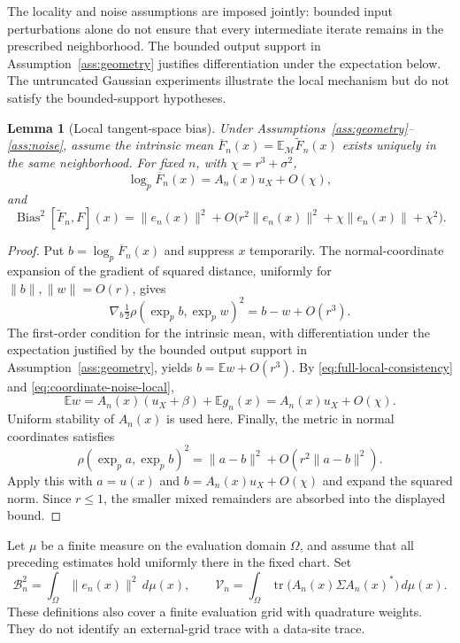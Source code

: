 \documentclass[12pt]{article}
\newtheorem{lemma}[theorem]{Lemma}
\newcommand{\M}{\mathcal{M}}
\newcommand{\bias}{\operatorname{Bias}^2}
\begin{document}
The locality and noise assumptions are imposed jointly: bounded input perturbations alone do not ensure that every intermediate iterate remains in the prescribed neighborhood. The bounded output support in Assumption~\ref{ass:geometry} justifies differentiation under the expectation below. The untruncated Gaussian experiments illustrate the local mechanism but do not satisfy the bounded-support hypotheses.

\begin{lemma}[Local tangent-space bias]\label{lem:manifold-linearization}
Under Assumptions~\ref{ass:geometry}--\ref{ass:noise}, assume the intrinsic mean $\overline F_n(x)=\mathbb E_{\M}\widetilde F_n(x)$ exists uniquely in the same neighborhood. For fixed $n$, with $\chi=r^3+\sigma^2$,
\[
 \log_p\overline F_n(x)=A_n(x)u_X+O(\chi),
\]
and
\[
 \bias[\widetilde F_n,F](x)=\|e_n(x)\|^2+
 O\bigl(r^2\|e_n(x)\|^2+\chi\|e_n(x)\|+\chi^2\bigr).
\]
\end{lemma}

\begin{proof}
Put $b=\log_p\overline F_n(x)$ and suppress $x$ temporarily. The normal-coordinate expansion of the gradient of squared distance, uniformly for $\|b\|,\|w\|=O(r)$, gives
\[
 \nabla_b\tfrac12\rho(\exp_pb,\exp_pw)^2=b-w+O(r^3).
\]
The first-order condition for the intrinsic mean, with differentiation under the expectation justified by the bounded output support in
Assumption~\ref{ass:geometry}, yields $b=\mathbb Ew+O(r^3)$. By \eqref{eq:full-local-consistency} and \eqref{eq:coordinate-noise-local},
\[
 \mathbb Ew=A_n(x)(u_X+\beta)+\mathbb Eg_n(x)
           =A_n(x)u_X+O(\chi).
\]
Uniform stability of $A_n(x)$ is used here. Finally, the metric in normal coordinates satisfies
\[
 \rho(\exp_pa,\exp_pb)^2
 =\|a-b\|^2+O(r^2\|a-b\|^2).
\]
Apply this with $a=u(x)$ and $b=A_n(x)u_X+O(\chi)$ and expand the squared norm. Since $r\leq1$, the smaller mixed remainders are absorbed into the displayed bound.
\end{proof}

Let $\mu$ be a finite measure on the evaluation domain $\Omega$, and assume that all preceding estimates hold uniformly there in the fixed chart. Set
\[
 \mathcal B_n^2=\int_\Omega\|e_n(x)\|^2\,d\mu(x),
 \qquad
 \mathcal V_n=\int_\Omega
       \operatorname{tr}\bigl(A_n(x)\Sigma A_n(x)^*\bigr)\,d\mu(x).
\]
These definitions also cover a finite evaluation grid with quadrature weights. They do not identify an external-grid trace with a data-site trace.
\end{document}
